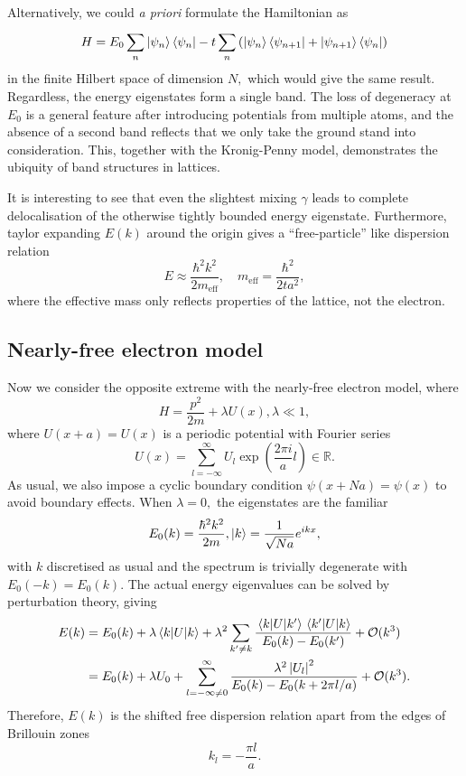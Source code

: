 \documentclass{article}
\theoremstyle{nonumberplain}
\begin{document}
Alternatively, we could \textit{a priori} formulate the Hamiltonian as
\[
    H = E_0 \sum_{n}^{} \ket{\psi_n}\bra{\psi_n} - t \sum_{n}^{} \left( \ket{\psi_n} \bra{\psi_{n+1}} + \ket{\psi_{n+1}} \bra{\psi_n}\right)
\]
in the finite Hilbert space of dimension $N,$ which would give the same result. Regardless, the energy eigenstates form a single band. The loss of degeneracy at $E_0$ is a general feature after introducing potentials from multiple atoms, and the absence of a second band reflects that we only take the ground stand into consideration. This, together with the Kronig-Penny model, demonstrates the ubiquity of band structures in lattices. 

It is interesting to see that even the slightest mixing $\gamma $ leads to complete delocalisation of the otherwise tightly bounded energy eigenstate. Furthermore, taylor expanding $E(k)$ around the origin gives a ``free-particle'' like dispersion relation
\[
    E \approx \frac{\hbar ^{2} k^{2} }{2m_{\mathrm{eff} }}, \quad 
    m_{\mathrm{eff} } = \frac{\hbar ^{2} }{2 t a^{2}},
\]
where the effective mass only reflects properties of the lattice, not the electron. 

\subsection{Nearly-free electron model}
Now we consider the opposite extreme with the nearly-free electron model, where 
\[
    H = \frac{p^{2} }{2m} + \lambda U(x), \lambda \ll 1, 
\]
where $U(x+a) = U(x)$ is a periodic potential with Fourier series
\[
    U(x) = \sum_{l=-\infty }^{\infty } U_l \exp \left( \frac{2 \pi  i}{a} l  \right) \in \mathbb{R}. 
\]
As usual, we also impose a cyclic boundary condition $\psi(x + N a) = \psi (x)$ to avoid boundary effects. When $\lambda = 0,$ the eigenstates are the familiar
\[
    E_0(k) = \frac{\hbar ^{2} k^{2} }{2m}, \ket{k} = \frac{1}{\sqrt{N a} } e^{i k x},
\]
with $k$ discretised as usual and the spectrum is trivially degenerate with $E_0(-k) = E_0(k)$. The actual energy eigenvalues can be solved by perturbation theory, giving
\[
    \begin{aligned}
        E(k) 
        &= E_0(k) + \lambda \ev{U}{k} + \lambda ^{2} \sum_{k^\prime \neq k}^{} \frac{\mel{k}{U}{k^\prime } \mel{k^\prime }{U}{k}}{E_0(k) - E_0(k^\prime )} + \mathcal{\MakeUppercase{O}}(k^3)\\
        &= E_0(k) + \lambda U_0 + \sum_{l=-\infty \neq 0}^{\infty} \frac{\lambda ^{2} \left\vert U_l \right\vert ^{2} }{E_0 (k) - E_0(k + 2\pi l /a)} + \mathcal{\MakeUppercase{O}}(k^3). 
    \end{aligned}
\]
Therefore, $E(k)$ is the shifted free dispersion relation apart from the edges of Brillouin zones
\[
    k_l = -\frac{\pi  l }{a}. 
\]
\end{document}
